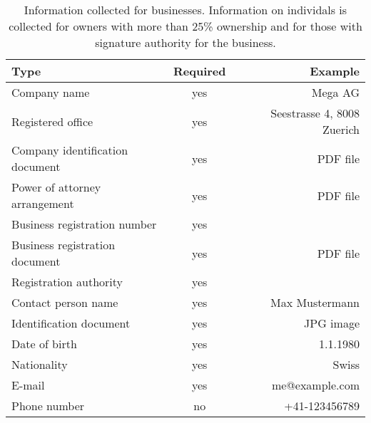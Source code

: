 \begin{table}
  \caption{Information collected for businesses. Information on individals is
    collected for owners with more than 25\% ownership and for those with
    signature authority for the business.}
  \label{table:proc:kyb:business}
  \begin{center}
    \begin{tabular}{l|c|r}
      {\bf Type}                      & {\bf Required} & {\bf Example}        \\ \hline \hline
      Company name                    & yes        & Mega AG \\
      Registered office               & yes        & Seestrasse 4, 8008 Zuerich \\
      Company identification document & yes        & PDF file \\ 
      Power of attorney arrangement   & yes        & PDF file  \\
      Business registration number    & yes        &  \\
      Business registration document  & yes        & PDF file \\
      Registration authority          & yes        &  \\ \hline
      Contact person name             & yes        & Max Mustermann \\
      Identification document         & yes        & JPG image \\
      Date of birth                   & yes        & 1.1.1980  \\
      Nationality                     & yes        & Swiss     \\ 
      E-mail                          & yes        & me@example.com \\
      Phone number                    & no         & +41-123456789  \\
  \end{tabular}
  \end{center}
\end{table}
